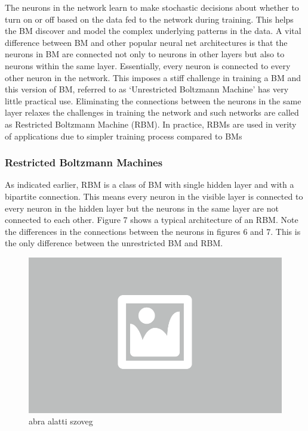 The neurons in the network learn to make stochastic decisions about whether to turn on or off based on the data fed to the network during training.  This helps the BM discover and model the complex underlying patterns in the data. A vital difference between BM and other popular neural net architectures is that the neurons in BM are connected not only to neurons in other layers but also to neurons within the same layer. Essentially, every neuron is connected to every other neuron in the network.  This imposes a stiff challenge in training a BM and this version of BM, referred to as ‘Unrestricted Boltzmann Machine’ has very little practical use. Eliminating the connections between the neurons in the same layer relaxes the challenges in training the network and such networks are called as Restricted Boltzmann Machine (RBM). In practice, RBMs are used in verity of applications due to simpler training process compared to BMs

\subsubsection{Restricted Boltzmann Machines}

As indicated earlier, RBM is a class of BM with single hidden layer and with a bipartite connection. This means every neuron in the visible layer is connected to every neuron in the hidden layer but the neurons in the same layer are not connected to each other. Figure 7 shows a typical architecture of an RBM. Note the differences in the connections between the neurons in figures 6 and 7. This is the only difference between the unrestricted BM and RBM.

\begin{figure}[h]
	\centering
	\includegraphics[width=0.65\columnwidth]{figures/abra.png}
	\caption{abra alatti szoveg}
\end{figure}


